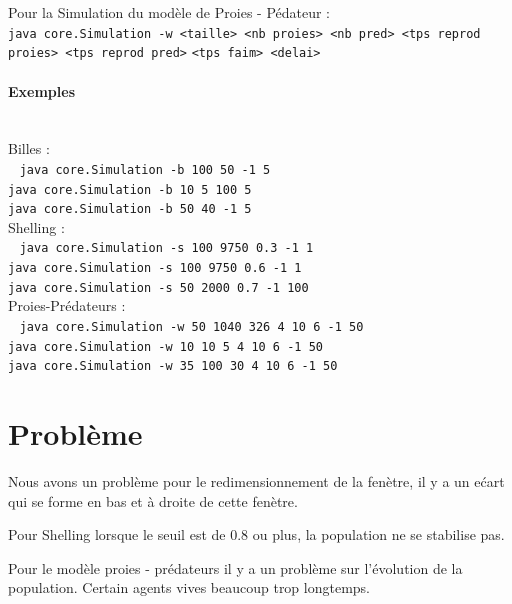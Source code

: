 \documentclass[a4paper,10pt]{article}
\begin{document}
Pour la Simulation du mod\`ele de Proies - P\'edateur : \\ 
\verb&java core.Simulation -w <taille> <nb proies> <nb pred> <tps reprod proies> <tps reprod pred>&
 \verb&<tps faim> <delai>& \\

\paragraph{Exemples} ~\\

Billes : \\
~
\verb&java core.Simulation -b 100 50 -1 5& \\
\verb&java core.Simulation -b 10 5 100 5& \\
\verb&java core.Simulation -b 50 40 -1 5& \\

Shelling : \\
~
\verb&java core.Simulation -s 100 9750 0.3 -1 1& \\
\verb&java core.Simulation -s 100 9750 0.6 -1 1 & \\
\verb&java core.Simulation -s 50 2000 0.7 -1 100 & \\

Proies-Pr\'edateurs : \\
~
\verb&java core.Simulation -w 50 1040 326 4 10 6 -1 50& \\
\verb&java core.Simulation -w 10 10 5 4 10 6 -1 50& \\
\verb&java core.Simulation -w 35 100 30 4 10 6 -1 50& \\

\section{Probl\`eme}

Nous avons un probl\`eme pour le redimensionnement de la fen\`etre, il y a un e\'cart qui se forme en bas et \`a droite de cette fen\`etre.

Pour Shelling lorsque le seuil est de 0.8 ou plus, la population ne se stabilise pas.

Pour le mod\`ele proies - pr\'edateurs il y a un probl\`eme sur l'\'evolution de la population. Certain agents vives beaucoup trop longtemps. 
\end{document}
